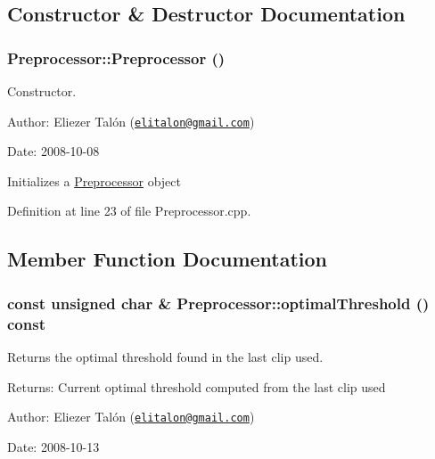 \subsection{Constructor \& Destructor Documentation}
\hypertarget{class_preprocessor_da966c8b83e7c3bcd8759549c3cdf688}{
\subsubsection[Preprocessor]{\setlength{\rightskip}{0pt plus 5cm}Preprocessor::Preprocessor ()}}
\label{class_preprocessor_da966c8b83e7c3bcd8759549c3cdf688}


Constructor. 

\begin{Desc}
\item[Author:]Eliezer Talón (\href{mailto:elitalon@gmail.com}{\tt elitalon@gmail.com}) \end{Desc}
\begin{Desc}
\item[Date:]2008-10-08\end{Desc}
Initializes a \hyperlink{class_preprocessor}{Preprocessor} object 

Definition at line 23 of file Preprocessor.cpp.

\subsection{Member Function Documentation}
\hypertarget{class_preprocessor_a44dff024a5b29752780bd4aa0d53d81}{
\subsubsection[optimalThreshold]{\setlength{\rightskip}{0pt plus 5cm}const unsigned char \& Preprocessor::optimalThreshold () const}}
\label{class_preprocessor_a44dff024a5b29752780bd4aa0d53d81}


Returns the optimal threshold found in the last clip used. 

\begin{Desc}
\item[Returns:]Current optimal threshold computed from the last clip used\end{Desc}
\begin{Desc}
\item[Author:]Eliezer Talón (\href{mailto:elitalon@gmail.com}{\tt elitalon@gmail.com}) \end{Desc}
\begin{Desc}
\item[Date:]2008-10-13 \end{Desc}


